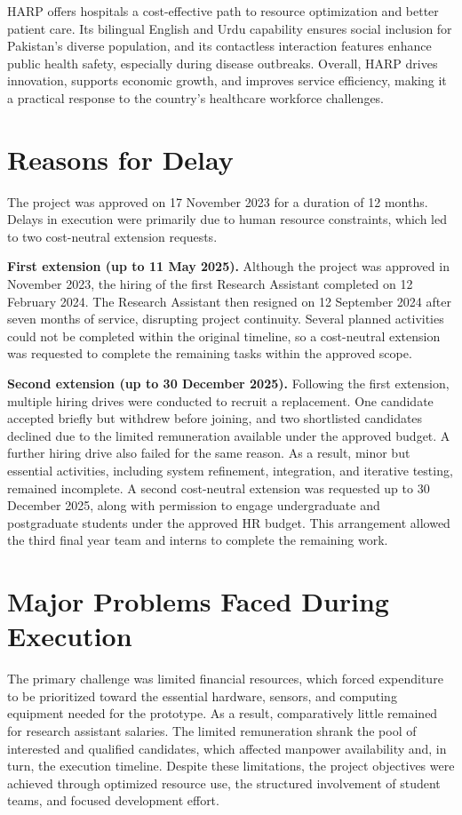 \documentclass[11pt,a4paper]{article}
\begin{document}
HARP offers hospitals a cost-effective path to resource optimization and better patient care. Its bilingual English and Urdu capability ensures social inclusion for Pakistan's diverse population, and its contactless interaction features enhance public health safety, especially during disease outbreaks. Overall, HARP drives innovation, supports economic growth, and improves service efficiency, making it a practical response to the country's healthcare workforce challenges.

\section{Reasons for Delay}

The project was approved on 17 November 2023 for a duration of 12 months. Delays in execution were primarily due to human resource constraints, which led to two cost-neutral extension requests.

\textbf{First extension (up to 11 May 2025).} Although the project was approved in November 2023, the hiring of the first Research Assistant completed on 12 February 2024. The Research Assistant then resigned on 12 September 2024 after seven months of service, disrupting project continuity. Several planned activities could not be completed within the original timeline, so a cost-neutral extension was requested to complete the remaining tasks within the approved scope.

\textbf{Second extension (up to 30 December 2025).} Following the first extension, multiple hiring drives were conducted to recruit a replacement. One candidate accepted briefly but withdrew before joining, and two shortlisted candidates declined due to the limited remuneration available under the approved budget. A further hiring drive also failed for the same reason. As a result, minor but essential activities, including system refinement, integration, and iterative testing, remained incomplete. A second cost-neutral extension was requested up to 30 December 2025, along with permission to engage undergraduate and postgraduate students under the approved HR budget. This arrangement allowed the third final year team and interns to complete the remaining work.

\section{Major Problems Faced During Execution}

The primary challenge was limited financial resources, which forced expenditure to be prioritized toward the essential hardware, sensors, and computing equipment needed for the prototype. As a result, comparatively little remained for research assistant salaries. The limited remuneration shrank the pool of interested and qualified candidates, which affected manpower availability and, in turn, the execution timeline. Despite these limitations, the project objectives were achieved through optimized resource use, the structured involvement of student teams, and focused development effort.
\end{document}
